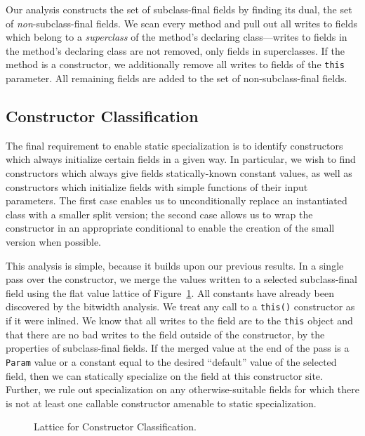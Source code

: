 \documentclass{acmconf}
\newcommand{\figscale}{1.0}
\begin{document}
Our analysis constructs the set of subclass-final fields by finding
its dual, the set of {\it non}-subclass-final fields.  We scan every
method and pull out all writes to fields which belong to
a {\it superclass} of the method's declaring class---writes to fields
in the method's declaring class are not removed, only fields in
superclasses.  If the method is a constructor, we additionally remove
all writes to fields of the {\tt this} parameter.  All remaining
fields are added to the set of non-subclass-final fields.

\subsection{Constructor Classification}
The final requirement to enable static specialization is to identify
constructors which always initialize certain fields in a given way.
In particular, we wish to find constructors which always give fields
statically-known constant values, as well as constructors which
initialize fields with simple functions of their input parameters.
The first case enables us to unconditionally replace an instantiated
class with a smaller split version; the second case allows us to wrap
the constructor in an appropriate conditional to enable the creation
of the small version when possible.

This analysis is simple, because it builds upon our previous results.
In a single pass over the constructor, we merge the values written
to a selected subclass-final field using the flat value lattice
of Figure~\ref{fig:cclat}.  All constants have already been discovered
by the bitwidth analysis.  We treat any call to a {\tt this()}
constructor as if it were inlined.  We know that all writes to the
field are to the {\tt this} object and that there are no bad writes to
the field outside of the constructor, by the properties of
subclass-final fields. If the merged value at the end of the pass 
is a {\tt Param} value or a constant equal to the desired ``default''
value of the selected field,
then we can statically specialize on the field at this constructor
site.  Further, we rule out specialization on any otherwise-suitable
fields for which there is not at least one callable constructor
amenable to static specialization.

\begin{figure}
\centering\renewcommand{\figscale}{0.6}
\caption{Lattice for Constructor Classification.}
\label{fig:cclat}
\end{figure}
\end{document}
